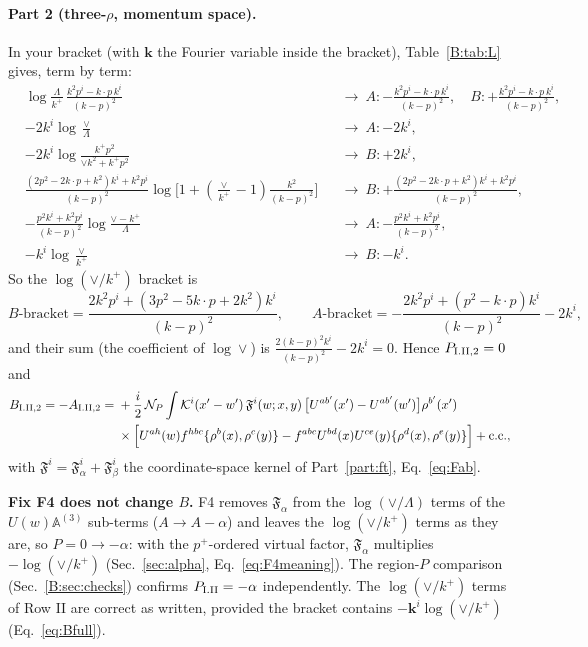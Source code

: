 \documentclass[10pt]{article}
\numberwithin{equation}{section}
\newcommand{\KK}{\mathcal K}
\newcommand{\NP}{\mathcal N_{P}}
\newcommand{\bk}{\mathbf k}
\begin{document}
\paragraph{Part 2 (three-$\rho$, momentum space).} In your bracket (with $\mathbf k$ the Fourier variable inside the bracket), Table~\ref{B:tab:L} gives, term by term:
\begin{align*}
&\log\tfrac{\Lambda}{k^+}\,\tfrac{k^2p^i-k\cdot p\,k^i}{(k-p)^2}&&\to\ A:-\tfrac{k^2p^i-k\cdot p\,k^i}{(k-p)^2},\quad B:+\tfrac{k^2p^i-k\cdot p\,k^i}{(k-p)^2},\\
&-2k^i\log\tfrac{\vee}{\Lambda}&&\to\ A:-2k^i,\\
&-2k^i\log\tfrac{k^+p^2}{\vee k^2+k^+p^2}&&\to\ B:+2k^i,\\
&\tfrac{(2p^2-2k\cdot p+k^2)k^i+k^2p^i}{(k-p)^2}\log\big[1+(\tfrac{\vee}{k^+}-1)\tfrac{k^2}{(k-p)^2}\big]&&\to\ B:+\tfrac{(2p^2-2k\cdot p+k^2)k^i+k^2p^i}{(k-p)^2},\\
&-\tfrac{p^2k^i+k^2p^i}{(k-p)^2}\log\tfrac{\vee-k^+}{\Lambda}&&\to\ A:-\tfrac{p^2k^i+k^2p^i}{(k-p)^2},\\
&-k^i\log\tfrac{\vee}{k^+}&&\to\ B:-k^i.
\end{align*}
So the $\log(\vee/k^+)$ bracket is
\begin{equation}
B\text{-bracket}=\frac{2k^2p^i+(3p^2-5k\cdot p+2k^2)k^i}{(k-p)^2},\qquad A\text{-bracket}=-\frac{2k^2p^i+(p^2-k\cdot p)k^i}{(k-p)^2}-2k^i,
\end{equation}
and their sum (the coefficient of $\log\vee$) is $\frac{2(k-p)^2k^i}{(k-p)^2}-2k^i=0$. Hence $P_{\rm I.II,2}=0$ and
\begin{align}
B_{\rm I.II,2}=-A_{\rm I.II,2}={}&+\frac{i}{2}\,\NP\int\KK^i(x'-w')\,\mathfrak F^i(w;x,y)\,\big[U^{ab'}(x')-U^{ab'}(w')\big]\rho^{b'}(x')\notag\\
&\times\Big[U^{ah}(w)f^{hbc}\{\rho^b(x),\rho^c(y)\}-f^{abc}U^{bd}(x)U^{ce}(y)\{\rho^d(x),\rho^e(y)\}\Big]+{\rm c.c.},
\end{align}
with $\mathfrak F^i=\mathfrak F^i_\alpha+\mathfrak F^i_\beta$ the coordinate-space kernel of Part~\ref{part:ft}, Eq.~\eqref{eq:Fab}.

\textbf{Fix F4 does not change $B$.} F4 removes $\mathfrak F_\alpha$ from the $\log(\vee/\Lambda)$ terms of the $U(w)\mathbb A^{(3)}$ sub-terms ($A\to A-\alpha$) and leaves the $\log(\vee/k^+)$ terms as they are, so $P=0\to-\alpha$: with the $p^+$-ordered virtual factor, $\mathfrak F_\alpha$ multiplies $-\log(\vee/k^+)$ (Sec.~\ref{sec:alpha}, Eq.~\eqref{eq:F4meaning}). The region-$P$ comparison (Sec.~\ref{B:sec:checks}) confirms $P_{\rm I.II}=-\alpha$ independently. The $\log(\vee/k^+)$ terms of Row II are correct as written, provided the bracket contains $-\bk^i\log(\vee/k^+)$ (Eq.~\eqref{eq:Bfull}).
\end{document}
